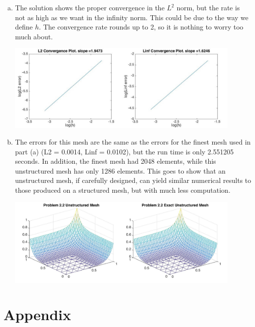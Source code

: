 \documentclass[11pt]{article}
\begin{document}
\begin{enumerate}[(a)]
\item The solution shows the proper convergence in the $L^2$ norm, but the rate is not as high as we want in the infinity norm. This could be due to the way we define $h$. The convergence rate rounds up to 2, so it is nothing to worry too much about.


\begin{center}
\includegraphics[width=0.9\textwidth]{2ERROR.jpg}
\end{center}

\item
The errors for this mesh are the same as the errors for the finest mesh used in part (a) (L2 = 0.0014, Linf = 0.0102), but the run time is only 2.551205 seconds. In addition, the finest mesh had 2048 elements, while this unstructured mesh has only 1286 elements. This goes to show that an unstructured mesh, if carefully designed, can yield similar numerical results to those produced on a structured mesh, but with much less computation.
\begin{center}
\includegraphics[width=0.9\textwidth]{22UE_.jpg}
\end{center}


\end{enumerate}

\newpage
\section*{Appendix}
\end{document}
